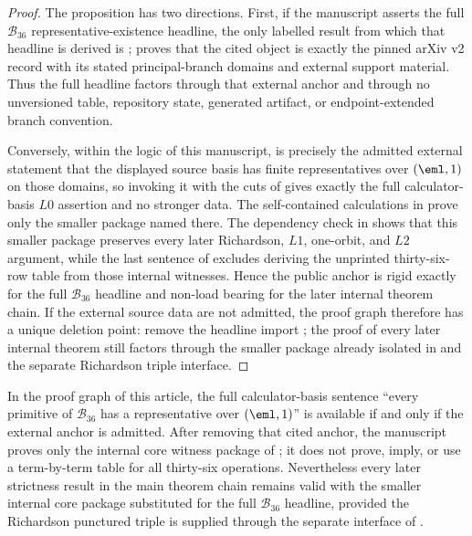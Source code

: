 \begin{proof}
The proposition has two directions.  First, if the manuscript asserts the full
\(\mathcal B_{36}\) representative-existence headline, the only labelled result
from which that headline is derived is ;
 proves that the cited object is exactly the
pinned arXiv v2 record with its stated principal-branch domains and external
support material.  Thus the full headline factors through that external
anchor and through no unversioned table, repository state, generated artifact, or
endpoint-extended branch convention.

Conversely, within the logic of this manuscript,  is
precisely the admitted external statement that the displayed source basis has
finite representatives over \((\eml,1)\) on those domains, so invoking it with the
cuts of  gives exactly the full calculator-basis
\(L0\) assertion and no stronger data.  The self-contained calculations in
 prove only the smaller package named
there.  The dependency check in
 shows that this smaller package
preserves every later Richardson, \(L1\), one-orbit, and \(L2\) argument, while
the last sentence of  excludes deriving the
unprinted thirty-six-row table from those internal witnesses.  Hence the public
anchor is rigid exactly for the full \(\mathcal B_{36}\) headline and non-load
bearing for the later internal theorem chain.  If the external source data are
not admitted, the proof graph therefore has a unique deletion point: remove the
headline import ; the proof of every later internal
theorem still factors through the smaller package already isolated in
 and the separate Richardson triple
interface.
\end{proof}

\begin{theorem}
\label{thm:no-hidden-self-contained-B36-theorem}
In the proof graph of this article, the full calculator-basis sentence
``every primitive of \(\mathcal B_{36}\) has a representative over
\((\eml,1)\)'' is available if and only if the external anchor
 is admitted.  After removing that cited anchor, the
manuscript proves only the internal core witness package of
; it does not prove, imply, or use a
term-by-term table for all thirty-six operations.  Nevertheless every later
strictness result in the main theorem chain remains valid with the smaller
internal core package substituted for the full \(\mathcal B_{36}\) headline,
provided the Richardson punctured triple is supplied through the separate
interface of .
\end{theorem}

